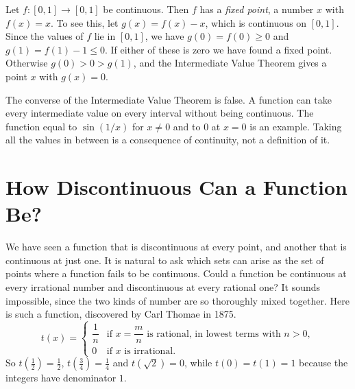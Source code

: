 \begin{example}
Let $f : [0,1] \to [0,1]$ be continuous.  Then $f$ has a \emph{fixed point}, a number $x$ with $f(x) = x$.  To see this, let $g(x) = f(x) - x$, which is continuous on $[0,1]$.  Since the values of $f$ lie in $[0,1]$, we have $g(0) = f(0) \geq 0$ and $g(1) = f(1) - 1 \leq 0$.  If either of these is zero we have found a fixed point.  Otherwise $g(0) > 0 > g(1)$, and the Intermediate Value Theorem gives a point $x$ with $g(x) = 0$.
\end{example}

\begin{marginfigure}
\centering
{}
\caption{A continuous graph that starts on the left side of the square and ends on the right side must cross the diagonal.  The crossing is a fixed point.}
\end{marginfigure}

\begin{dangerousbend}
The converse of the Intermediate Value Theorem is false.  A function can take every intermediate value on every interval without being continuous.  The function equal to $\sin(1/x)$ for $x \neq 0$ and to $0$ at $x = 0$ is an example.  Taking all the values in between is a consequence of continuity, not a definition of it.
\end{dangerousbend}

\section{How Discontinuous Can a Function Be?}

We have seen a function that is discontinuous at every point, and another that is continuous at just one.  It is natural to ask which sets can arise as the set of points where a function fails to be continuous.  Could a function be continuous at every irrational number and discontinuous at every rational one?  It sounds impossible, since the two kinds of number are so thoroughly mixed together.  Here is such a function, discovered by Carl Thomae in 1875.
\begin{displaymath}
   t(x) = \left\{
     \begin{array}{ll}
       \dfrac1n & \text{if } x = \dfrac{m}{n} \text{ is rational, in lowest terms with } n > 0, \\[2ex]
       0 & \text{if } x \text{ is irrational.}
     \end{array}
   \right.
\end{displaymath}
So $t\left(\frac12\right) = \frac12$, $t\left(\frac34\right) = \frac14$ and $t(\sqrt2) = 0$, while $t(0) = t(1) = 1$ because the integers have denominator $1$.

